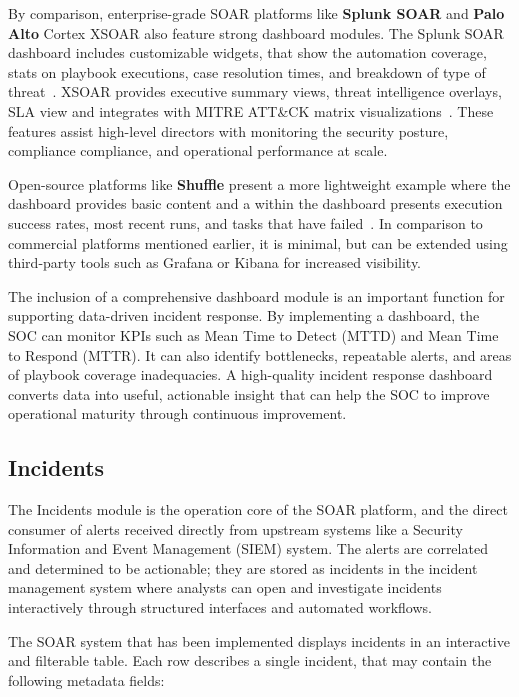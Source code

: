 By comparison, enterprise-grade SOAR platforms like \textbf{Splunk SOAR} and \textbf{Palo Alto} Cortex XSOAR also feature strong dashboard modules. The Splunk SOAR dashboard includes customizable widgets, that show the automation coverage, stats on playbook executions, case resolution times, and breakdown of type of threat~\cite{splunk}. XSOAR provides executive summary views, threat intelligence overlays, SLA view and integrates with MITRE ATT\&CK matrix visualizations~\cite{paloalto}. These features assist high-level directors with monitoring the security posture, compliance compliance, and operational performance at scale.

Open-source platforms like \textbf{Shuffle} present a more lightweight example where the dashboard provides basic content and a within the dashboard presents execution success rates, most recent runs, and tasks that have failed~\cite{techtarget}. In comparison to commercial platforms mentioned earlier, it is minimal, but can be extended using third-party tools such as Grafana or Kibana for increased visibility.

The inclusion of a comprehensive dashboard module is an important function for supporting data-driven incident response. By implementing a dashboard, the SOC can monitor KPIs such as Mean Time to Detect (MTTD) and Mean Time to Respond (MTTR). It can also identify bottlenecks, repeatable alerts, and areas of playbook coverage inadequacies. A high-quality incident response dashboard converts data into useful, actionable insight that can help the SOC to improve operational maturity through continuous improvement.

\subsection{Incidents}

The Incidents module is the operation core of the SOAR platform, and the direct consumer of alerts received directly from upstream systems like a Security Information and Event Management (SIEM) system. The alerts are correlated and determined to be actionable; they are stored as incidents in the incident management system where analysts can open and investigate incidents interactively through structured interfaces and automated workflows.

The SOAR system that has been implemented displays incidents in an interactive and filterable table. Each row describes a single incident, that may contain the following metadata fields:

